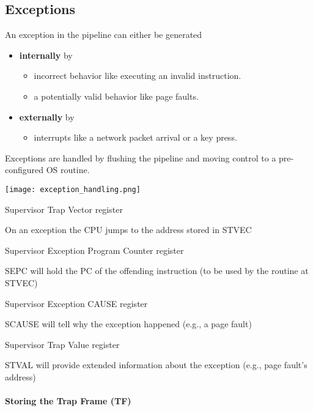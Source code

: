 \subsection{Exceptions}\label{exceptions}
An exception in the pipeline can either be generated
\begin{itemize}
    \item \textbf{internally} by
          \begin{itemize}
              \item incorrect behavior like executing an invalid instruction.
              \item a potentially valid behavior like page faults.
          \end{itemize}
    \item \textbf{externally} by
          \begin{itemize}
              \item interrupts like a network packet arrival or a key press.
          \end{itemize}
\end{itemize}

Exceptions are handled by flushing the pipeline and moving control to a pre-configured OS routine.

\begin{center}
    \texttt{[image: exception\_handling.png]}
\end{center}

\newpar{}
 Supervisor Trap Vector register

On an exception the CPU jumps to the address stored in STVEC

\newpar{}
 Supervisor Exception Program Counter register

SEPC will hold the PC of the offending instruction (to be used by the routine at STVEC)

\newpar{}
 Supervisor Exception CAUSE register

SCAUSE will tell why the exception happened (e.g., a page fault)

\newpar{}
 Supervisor Trap Value register

STVAL will provide extended information about the exception (e.g., page fault's address)

\paragraph{Storing the Trap Frame (TF)}

